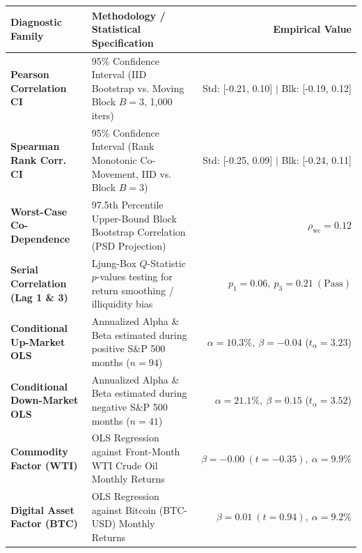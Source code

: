 \documentclass[10pt,a4paper]{article}
\begin{document}
\vspace{0.45em}

\begin{tcolorbox}[colback=white, colframe=primary, title=\textbf{\small\strut Appendix A: Extended Statistical, Bootstrap \& Factor Diagnostics}, fonttitle=\sffamily\bfseries\small, arc=5pt, boxrule=0.8pt, toptitle=4pt, bottomtitle=4pt, left=6pt, right=6pt, top=3.5pt, bottom=3.5pt, colbacktitle=primary]
\renewcommand{\arraystretch}{1.22}
\scriptsize
\begin{tabularx}{\textwidth}{l X r}
\toprule
\textbf{\textcolor{primary}{Diagnostic Family}} & \textbf{\textcolor{primary}{Methodology / Statistical Specification}} & \textbf{\textcolor{primary}{Empirical Value}} \\
\midrule
\textbf{Pearson Correlation CI} & 95\% Confidence Interval (IID Bootstrap vs. Moving Block $B=3$, 1,000 iters) & Std: [-0.21, 0.10] $\vert$ Blk: [-0.19, 0.12] \\
\rowcolor{cardbg} \textbf{Spearman Rank Corr. CI} & 95\% Confidence Interval (Rank Monotonic Co-Movement, IID vs. Block $B=3$) & Std: [-0.25, 0.09] $\vert$ Blk: [-0.24, 0.11] \\
\textbf{Worst-Case Co-Dependence} & 97.5th Percentile Upper-Bound Block Bootstrap Correlation (PSD Projection) & $\rho_{\text{wc}} = 0.12$ \\
\rowcolor{cardbg} \textbf{Serial Correlation (Lag 1 \& 3)} & Ljung-Box $Q$-Statistic $p$-values testing for return smoothing / illiquidity bias & $p_1=0.06,\ p_3=0.21\ (\text{Pass})$ \\
\textbf{Conditional Up-Market OLS} & Annualized Alpha \& Beta estimated during positive S\&P 500 months ($n=94$) & $\alpha=10.3\%,\ \beta=-0.04$ ($t_\alpha=3.23$) \\
\rowcolor{cardbg} \textbf{Conditional Down-Market OLS} & Annualized Alpha \& Beta estimated during negative S\&P 500 months ($n=41$) & $\alpha=21.1\%,\ \beta=0.15$ ($t_\alpha=3.52$) \\
\textbf{Commodity Factor (WTI)} & OLS Regression against Front-Month WTI Crude Oil Monthly Returns & $\beta=-0.00\ (t=-0.35),\ \alpha=9.9\%$ \\
\rowcolor{cardbg} \textbf{Digital Asset Factor (BTC)} & OLS Regression against Bitcoin (BTC-USD) Monthly Returns & $\beta=0.01\ (t=0.94),\ \alpha=9.2\%$ \\
\bottomrule
\end{tabularx}
\end{tcolorbox}
\end{document}
